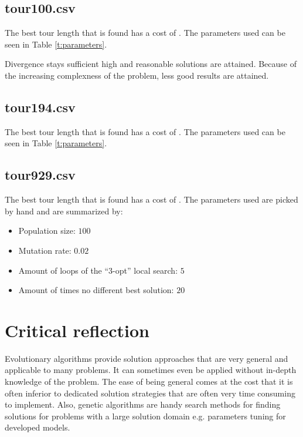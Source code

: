 \documentclass[a4paper,10pt]{article}
\begin{document}




\subsection{tour100.csv}
The best tour length that is found has a cost of $  $.
The parameters used can be seen in Table \ref{t:parameters}.



Divergence stays sufficient high and reasonable solutions are attained. Because of the increasing complexness of the problem, less good results are attained. 


\subsection{tour194.csv}
The best tour length that is found has a cost of $  $.
The parameters used can be seen in Table \ref{t:parameters}.




\subsection{tour929.csv}
The best tour length that is found  has a cost of $  $.
The parameters used are picked by hand and are summarized by: 
\begin{itemize}
	\item Population size: $ 100 $
	\item Mutation rate: $ 0.02 $
	\item Amount of loops of the ``3-opt'' local search: $ 5 $
	\item Amount of times no different best solution: $ 20 $ 
\end{itemize}



\section{Critical reflection}

Evolutionary algorithms provide solution approaches that are very general and applicable to many problems. It can sometimes even be applied without in-depth knowledge of the problem. The ease of being general comes at the cost that it is often inferior to dedicated solution strategies that are often very time consuming to implement. Also, genetic algorithms are handy search methods for finding solutions for problems with a large solution domain e.g. parameters tuning for developed models.  




\end{document}
